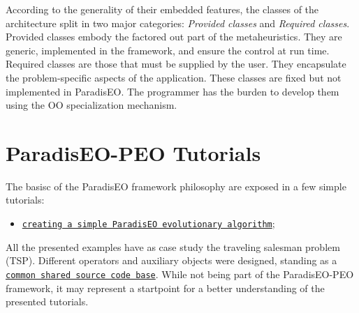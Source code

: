 According to the generality of their embedded features, the classes of the architecture split in two major categories: {\em Provided classes\/} and {\em Required classes\/}. Provided classes embody the factored out part of the metaheuristics. They are generic, implemented in the framework, and ensure the control at run time. Required classes are those that must be supplied by the user. They encapsulate the problem-specific aspects of the application. These classes are fixed but not implemented in Paradis\-EO. The programmer has the burden to develop them using the OO specialization mechanism.\hypertarget{main_tutorials}{}\section{Paradis\-EO-PEO Tutorials}\label{main_tutorials}
The basisc of the Paradis\-EO framework philosophy are exposed in a few simple tutorials: \begin{itemize}
\item \href{lesson1/html/main.html}{\tt creating a simple Paradis\-EO evolutionary algorithm};  \end{itemize}
All the presented examples have as case study the traveling salesman problem (TSP). Different operators and auxiliary objects were designed, standing as a \href{lsnshared/html/index.html}{\tt common shared source code base}. While not being part of the Paradis\-EO-PEO framework, it may represent a startpoint for a better understanding of the presented tutorials. 